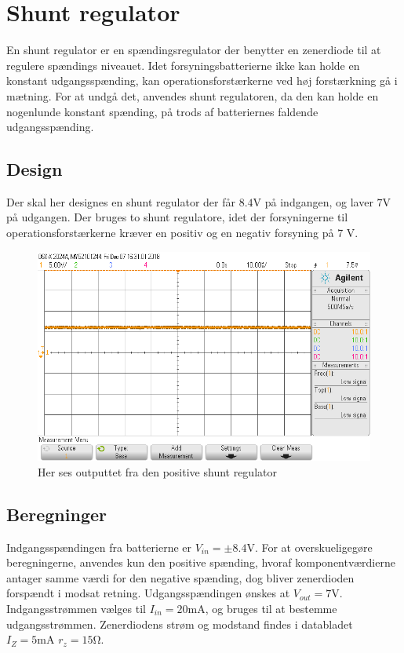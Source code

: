 \section{Shunt regulator}\label{sec:shunt}
En shunt regulator er en spændingsregulator der benytter en zenerdiode til at regulere spændings niveauet.
Idet forsyningsbatterierne ikke kan holde en konstant udgangsspænding, kan operationsforstærkerne ved høj forstærkning gå i mætning. 
For at undgå det, anvendes shunt regulatoren, da den kan holde en nogenlunde konstant spænding, på trods af batteriernes faldende udgangsspænding.

\subsection{Design}
Der skal her designes en shunt regulator der får $8.4 \si{\volt}$ på indgangen, og laver $7\si{\volt}$ på udgangen.
Der bruges to shunt regulatore, idet der forsyningerne til operationsforstærkerne kræver en positiv og en negativ forsyning på 7 \si{\volt}.
\begin{figure}[h!]
	\centering
	\includegraphics[width=1\textwidth]{billeder/shunt_pos_png.png}
	\caption{Her ses outputtet fra den positive shunt regulator}
	\label{fig:positiv_shunt}
\end{figure}
\subsection{Beregninger}
Indgangsspændingen fra batterierne er $V_{in} = \pm 8.4 \si{\volt}$. 
For at overskueligegøre beregningerne, anvendes kun den positive spænding, hvoraf komponentværdierne antager samme værdi for den negative spænding, dog bliver zenerdioden forspændt i modsat retning.
Udgangsspændingen ønskes at $V_{out} = 7 \si{\volt}$. 
Indgangsstrømmen vælges til $I_{in} = 20\si{\milli\ampere}$, og bruges til at bestemme udgangsstrømmen.
Zenerdiodens strøm og modstand findes i databladet $I_Z = 5 \si{\milli\ampere}$ $r_z = 15 \si{\ohm}$. \cite[Side. 1 Kolonne 12]{ZenerDiode}

